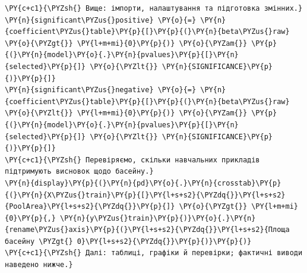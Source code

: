 \begin{Verbatim}[commandchars=\\\{\}]
\PY{c+c1}{\PYZsh{} Вище: імпорти, налаштування та підготовка змінних.}
\PY{n}{significant\PYZus{}positive} \PY{o}{=} \PY{n}{coefficient\PYZus{}table}\PY{p}{[}\PY{p}{(}\PY{n}{beta\PYZus{}raw} \PY{o}{\PYZgt{}} \PY{l+m+mi}{0}\PY{p}{)} \PY{o}{\PYZam{}} \PY{p}{(}\PY{n}{model}\PY{o}{.}\PY{n}{pvalues}\PY{p}{[}\PY{n}{selected}\PY{p}{]} \PY{o}{\PYZlt{}} \PY{n}{SIGNIFICANCE}\PY{p}{)}\PY{p}{]}
\PY{n}{significant\PYZus{}negative} \PY{o}{=} \PY{n}{coefficient\PYZus{}table}\PY{p}{[}\PY{p}{(}\PY{n}{beta\PYZus{}raw} \PY{o}{\PYZlt{}} \PY{l+m+mi}{0}\PY{p}{)} \PY{o}{\PYZam{}} \PY{p}{(}\PY{n}{model}\PY{o}{.}\PY{n}{pvalues}\PY{p}{[}\PY{n}{selected}\PY{p}{]} \PY{o}{\PYZlt{}} \PY{n}{SIGNIFICANCE}\PY{p}{)}\PY{p}{]}
\PY{c+c1}{\PYZsh{} Перевіряємо, скільки навчальних прикладів підтримують висновок щодо басейну.}
\PY{n}{display}\PY{p}{(}\PY{n}{pd}\PY{o}{.}\PY{n}{crosstab}\PY{p}{(}\PY{n}{X\PYZus{}train}\PY{p}{[}\PY{l+s+s2}{\PYZdq{}}\PY{l+s+s2}{PoolArea}\PY{l+s+s2}{\PYZdq{}}\PY{p}{]} \PY{o}{\PYZgt{}} \PY{l+m+mi}{0}\PY{p}{,} \PY{n}{y\PYZus{}train}\PY{p}{)}\PY{o}{.}\PY{n}{rename\PYZus{}axis}\PY{p}{(}\PY{l+s+s2}{\PYZdq{}}\PY{l+s+s2}{Площа басейну \PYZgt{} 0}\PY{l+s+s2}{\PYZdq{}}\PY{p}{)}\PY{p}{)}
\PY{c+c1}{\PYZsh{} Далі: таблиці, графіки й перевірки; фактичні виводи наведено нижче.}
\end{Verbatim}
